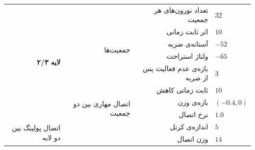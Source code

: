 \documentclass[12pt]{report}
\begin{document}
\begin{table}[p]
{\begin{tabular}{|rrrl|}
		\multicolumn{1}{|r|}{\multirow{8}{*}{\textbf{لایه ۲/۳}}}        & \multicolumn{1}{r|}{\multirow{6}{*}{جمعیت‌ها}}                 & \multicolumn{1}{r|}{تعداد نورون‌های هر جمعیت}             & $32$ \\ \cline{3-4} 
		\multicolumn{1}{|r|}{}                                          & \multicolumn{1}{r|}{}                                          & \multicolumn{1}{r|}{اثر ثابت زمانی} & $10$                      \\ \cline{3-4} 
		\multicolumn{1}{|r|}{}                                          & \multicolumn{1}{r|}{}                                          & \multicolumn{1}{r|}{آستانه‌ی ضربه}                        & $-52$                     \\ \cline{3-4} 
		\multicolumn{1}{|r|}{}                                          & \multicolumn{1}{r|}{}                                          & \multicolumn{1}{r|}{ولتاژ استراحت}                        & $-65$                     \\ \cline{3-4} 
		\multicolumn{1}{|r|}{}                                          & \multicolumn{1}{r|}{}                                          & \multicolumn{1}{r|}{بازه‌ی عدم فعالیت پس از ضربه}         & $3$                       \\ \cline{3-4} 
		\multicolumn{1}{|r|}{}                                          & \multicolumn{1}{r|}{}                                          & \multicolumn{1}{r|}{ثابت زمانی کاهش}                      & $10$                      \\ \cline{2-4} 
		\multicolumn{1}{|r|}{}                                          & \multicolumn{1}{r|}{\multirow{2}{*}{اتصال مهاری بین دو جمعیت}} & \multicolumn{1}{r|}{بازه‌ی وزن}                           & $(-0.4,0)$                \\ \cline{3-4} 
		\multicolumn{1}{|r|}{}                                          & \multicolumn{1}{r|}{}                                          & \multicolumn{1}{r|}{نرخ اتصال}                            & $1.0$                     \\ \hline
		\multicolumn{1}{|r|}{\multirow{3}{*}{اتصال پولینگ بین دو لایه}} & \multicolumn{2}{r|}{اندازه‌ی کرنل}                                                                                         & $5$                       \\ \cline{2-4} 
		\multicolumn{1}{|r|}{}                                          & \multicolumn{2}{r|}{وزن اتصال}                                                                                             & $14$                      \\ \cline{2-4} 

\end{tabular}}
\end{table}
\end{document}
